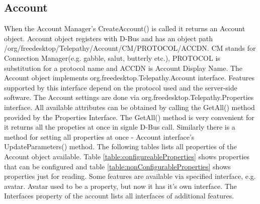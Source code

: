 \subsection*{Account}
When the Account Manager's CreateAccount() is called it returns an Account object. Account object registers with D-Bus and has an object path /org/freedesktop/Telepathy/Account/CM/PROTOCOL/ACCDN. CM stands for Connection Manager(e.g. gabble, salut, butterly etc.), PROTOCOL is substitution for a protocol name and ACCDN is Account Display Name. The Account object implements org.freedesktop.Telepathy.Account interface. Features supported by this interface depend on the protocol used and the server-side software. The Account settings are done via org.freedesktop.Telepathy.Properties interface. All available attributes can be obtained by calling the GetAll() method provided by the Properties Interface. The GetAll() method is very convenient for it returns all the propeties at once in signle D-Bus call. Similarly there is a method for setting all properties at once - Account interface's UpdateParameters() method. The following tables lists all properties of the Account object available. Table \ref{table:configureableProperties} shows properties that can be configured and table \ref{table:nonConfigurableProperties} shows properties just for reading. Some features are available via specified interface, e.g. avatar. Avatar used to be a property, but now it has it's own interface. The Interfaces property of the account lists all interfaces of additional features.\cite{tpWikiBasicTerminology}\cite{tpWikiAccount}


